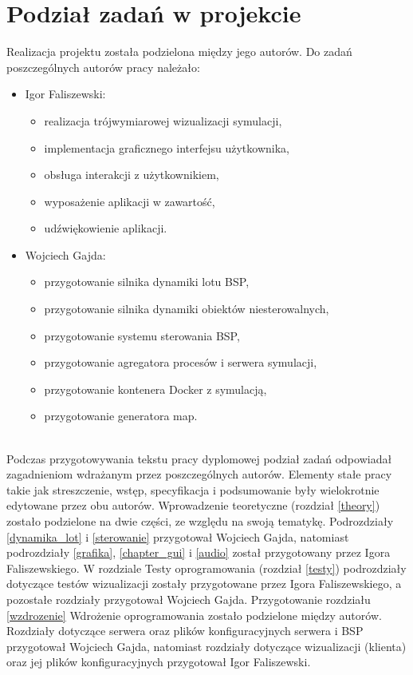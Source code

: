 \chapter{Podział zadań w projekcie}

Realizacja projektu została podzielona między jego autorów. Do zadań poszczególnych autorów pracy należało:\\

\begin{itemize}
	\item Igor Faliszewski:
	\begin{itemize}[noitemsep,nolistsep]
		\item realizacja trójwymiarowej wizualizacji symulacji,
		\item implementacja graficznego interfejsu użytkownika,
		\item obsługa interakcji z użytkownikiem,
		\item wyposażenie aplikacji w zawartość,
		\item udźwiękowienie aplikacji.
	\end{itemize}
	\item Wojciech Gajda:
	\begin{itemize}[noitemsep,nolistsep]
		\item przygotowanie silnika dynamiki lotu BSP,
		\item przygotowanie silnika dynamiki obiektów niesterowalnych,
		\item przygotowanie systemu sterowania BSP,
		\item przygotowanie agregatora procesów i serwera symulacji,
		\item przygotowanie kontenera Docker z symulacją,
		\item przygotowanie generatora map.
	\end{itemize}
\end{itemize}
\ \\

Podczas przygotowywania tekstu pracy dyplomowej podział zadań odpowiadał zagadnieniom wdrażanym przez poszczególnych autorów. Elementy stałe pracy takie jak streszczenie, wstęp, specyfikacja i podsumowanie były wielokrotnie edytowane przez obu autorów. Wprowadzenie teoretyczne (rozdział \ref{theory}) zostało podzielone na dwie części, ze względu na swoją tematykę. Podrozdziały \ref{dynamika_lot} i \ref{sterowanie} przygotował Wojciech Gajda, natomiast podrozdziały \ref{grafika}, \ref{chapter_gui} i \ref{audio} został przygotowany przez Igora Faliszewskiego. W rozdziale Testy oprogramowania (rozdział \ref{testy}) podrozdziały dotyczące testów wizualizacji zostały przygotowane przez Igora Faliszewskiego, a pozostałe rozdziały przygotował Wojciech Gajda. Przygotowanie rozdziału \ref{wzdrozenie} Wdrożenie oprogramowania  zostało podzielone między autorów. Rozdziały dotyczące serwera oraz plików konfiguracyjnych serwera i BSP przygotował Wojciech Gajda, natomiast rozdziały dotyczące wizualizacji (klienta) oraz jej plików konfiguracyjnych przygotował Igor Faliszewski.

